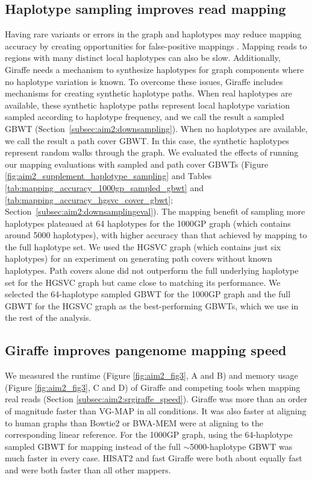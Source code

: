 \documentclass[11pt]{ucscthesis}
\begin{document}
\subsection{Haplotype sampling improves read mapping}
Having rare variants or errors in the graph and haplotypes may reduce mapping accuracy by creating opportunities for false-positive mappings \cite{Pritt2018}.
Mapping reads to regions with many distinct local haplotypes can also be slow.
Additionally, Giraffe needs a mechanism to synthesize haplotypes for graph components where no haplotype variation is known.
To overcome these issues, Giraffe includes mechanisms for creating synthetic haplotype paths.
When real haplotypes are available, these synthetic haplotype paths represent local haplotype variation sampled according to haplotype frequency, and we call the result a sampled GBWT (Section~\ref{subsec:aim2:downsampling}).
When no haplotypes are available, we call the result a path cover GBWT.
In this case, the synthetic haplotypes represent random walks through the graph. We evaluated the effects of running our mapping evaluations with sampled and path cover GBWTs (Figure \ref{fig:aim2_supplement_haplotype_sampling} and Tables \ref{tab:mapping_accuracy_1000gp_sampled_gbwt} and \ref{tab:mapping_accuracy_hgsvc_cover_gbwt}; Section~\ref{subsec:aim2:downsamplingeval}).
The mapping benefit of sampling more haplotypes plateaued at 64 haplotypes for the 1000GP graph (which contains around 5000 haplotypes), with higher accuracy than that achieved by mapping to the full haplotype set.
We used the HGSVC graph (which contains just six haplotypes) for an experiment on generating path covers without known haplotypes.
Path covers alone did not outperform the full underlying haplotype set for the HGSVC graph but came close to matching its performance.
We selected the 64-haplotype sampled GBWT for the 1000GP graph and the full GBWT for the HGSVC graph as the best-performing GBWTs, which we use in the rest of the analysis.

\subsection{Giraffe improves pangenome mapping speed}
We measured the runtime (Figure \ref{fig:aim2_fig3}, A and B) and memory usage (Figure \ref{fig:aim2_fig3}, C and D) of Giraffe and competing tools when mapping real reads (Section \ref{subsec:aim2:srgiraffe_speed}).
Giraffe was more than an order of magnitude faster than VG-MAP in all conditions.
It was also faster at aligning to human graphs than Bowtie2 or BWA-MEM were at aligning to the corresponding linear reference.
For the 1000GP graph, using the 64-haplotype sampled GBWT for mapping instead of the full $\sim$5000-haplotype GBWT was much faster in every case.
HISAT2 and fast Giraffe were both about equally fast and were both faster than all other mappers.
\end{document}
